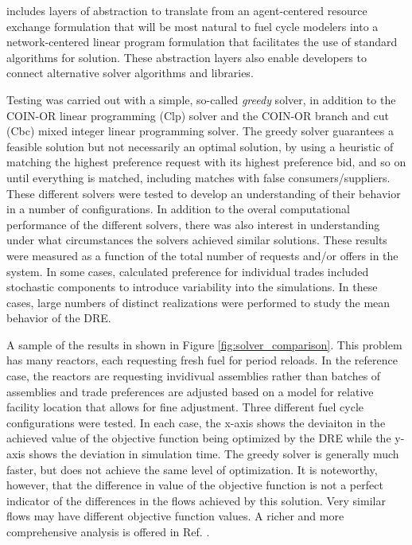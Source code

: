 \Cyclus{} includes layers of abstraction to translate from an agent-centered
resource exchange formulation that will be most natural to fuel cycle modelers
into a network-centered linear program formulation that facilitates the use of
standard algorithms for solution.  These abstraction layers also enable
developers to connect alternative solver algorithms and libraries.

Testing was carried out with a simple, so-called \textit{greedy} solver, in
addition to the \gls{COIN-OR} linear programming (Clp) solver and the
\gls{COIN-OR} branch and cut (Cbc) mixed integer linear programming solver.
The greedy solver guarantees a feasible solution but not necessarily an
optimal solution, by using a heuristic of matching the highest preference
request with its highest preference bid, and so on until everything is
matched, including matches with false consumers/suppliers.  These different
solvers were tested to develop an understanding of their behavior in a number
of configurations. In addition to the overal computational
performance of the different solvers, there was also interest in understanding
under what circumstances the solvers achieved similar solutions.  These
results were measured as a function of the total number of requests and/or
offers in the system.  In some cases, calculated preference for individual
trades included stochastic components to introduce variability into the
simulations.  In these cases, large numbers of distinct realizations were
performed to study the mean behavior of the \gls{DRE}.

A sample of the results in shown in Figure \ref{fig:solver_comparison}.  This
problem has many reactors, each requesting fresh fuel for period reloads.  In
the reference case, the reactors are requesting invidivual assemblies rather
than batches of assemblies and trade preferences are adjusted based on a model
for relative facility location that allows for fine adjustment.  Three
different fuel cycle configurations were tested. In each case, the x-axis
shows the deviaiton in the achieved value of the objective function being
optimized by the \gls{DRE} while the y-axis shows the deviation in simulation
time.  The greedy solver is generally much faster, but does not achieve the
same level of optimization.  It is noteworthy, however, that the difference in
value of the objective function is not a perfect indicator of the differences
in the flows achieved by this solution.  Very similar flows may have different
objective function values.  A richer and more comprehensive analysis is
offered in Ref. .

